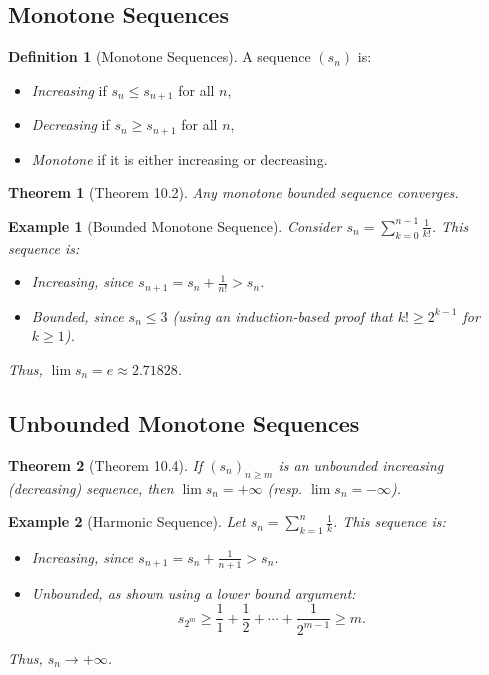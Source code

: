 \documentclass[9pt]{article}
\theoremstyle{definition}
\newtheorem{definition}{Definition}
\theoremstyle{plain}
\newtheorem{theorem}{Theorem}
\newtheorem{example}{Example}
\begin{document}
\subsection*{Monotone Sequences}
\begin{definition}[Monotone Sequences]
A sequence \( (s_n) \) is:
\begin{itemize}
    \item \textit{Increasing} if \( s_n \leq s_{n+1} \) for all \( n \),
    \item \textit{Decreasing} if \( s_n \geq s_{n+1} \) for all \( n \),
    \item \textit{Monotone} if it is either increasing or decreasing.
\end{itemize}
\end{definition}

\begin{theorem}[Theorem 10.2]
Any monotone bounded sequence converges.
\end{theorem}

\begin{example}[Bounded Monotone Sequence]
Consider \( s_n = \sum_{k=0}^{n-1} \frac{1}{k!} \). This sequence is:
\begin{itemize}
    \item Increasing, since \( s_{n+1} = s_n + \frac{1}{n!} > s_n \).
    \item Bounded, since \( s_n \leq 3 \) (using an induction-based proof that \( k! \geq 2^{k-1} \) for \( k \geq 1 \)).
\end{itemize}
Thus, \( \lim s_n = e \approx 2.71828 \).
\end{example}

\subsection*{Unbounded Monotone Sequences}
\begin{theorem}[Theorem 10.4]
If \( (s_n)_{n \geq m} \) is an unbounded increasing (decreasing) sequence, then \( \lim s_n = +\infty \) (resp. \( \lim s_n = -\infty \)).
\end{theorem}

\begin{example}[Harmonic Sequence]
Let \( s_n = \sum_{k=1}^n \frac{1}{k} \). This sequence is:
\begin{itemize}
    \item Increasing, since \( s_{n+1} = s_n + \frac{1}{n+1} > s_n \).
    \item Unbounded, as shown using a lower bound argument:
    \[
    s_{2^m} \geq \frac{1}{1} + \frac{1}{2} + \cdots + \frac{1}{2^{m-1}} \geq m.
    \]
\end{itemize}
Thus, \( s_n \to +\infty \).
\end{example}
\end{document}
